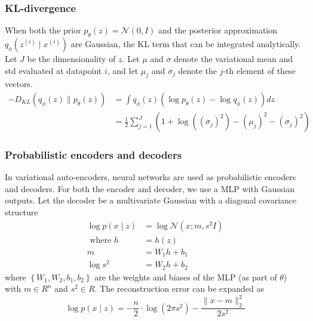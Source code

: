 \subsubsection*{KL-divergence}
When both the prior $p_{\theta}(z)=\mathcal{N} (0, I)$ and the posterior approximation $q_{\phi} \left(z^{(i)} \mid x^{(i)}\right)$ are Gaussian, the KL term that can be integrated analytically. Let $J$ be the dimensionality of $z$. Let $\mu$ and $\sigma$ denote the variational mean and std evaluated at datapoint $i$, and let $\mu_{j}$ and $\sigma_{j}$ denote the $j$-th element of these vectors.
\begin{equation*}
\begin{aligned}
-D_{KL}\left(q_{\phi}(z) \| p_{\theta}(z)\right)
&=\int q_{\phi}(z)\left(\log p_{\theta}(z)-\log q_{\phi}(z)\right) dz \\
&=\frac{1}{2} \sum_{j=1}^{J}\left(1+\log \left(\left(\sigma_{j}\right)^{2}\right)-\left(\mu_{j}\right)^{2}-\left(\sigma_{j}\right)^{2}\right)
\end{aligned}
\end{equation*}

\subsubsection*{Probabilistic encoders and decoders}
In variational auto-encoders, neural networks are used as probabilistic encoders and decoders. For both the encoder and decoder, we use a MLP with Gaussian outputs. Let the decoder be a multivariate Gaussian with a diagonal covariance structure
\begin{equation*}
\begin{aligned}
\log p\left(x \mid z\right) &=\log \mathcal{N}\left(x; m, {s^{2}}I\right) \\
\text{ where } h &= h \left(z\right) \\
m &=W_{1}h+b_{1} \\
\log {s^{2}} &=W_{2}h+b_{2}
\end{aligned}
\end{equation*}
where $\left\{W_{1}, W_{2}, b_{1}, b_{2} \right\}$ are the weights and biases of the MLP (as part of $\theta$) with $m \in R^{n}$ and $s^{2} \in R$. The reconstruction error can be expanded as
\begin{equation*}
\log p\left(x \mid z\right) = -\frac{n}{2} \cdot \log \left(2\pi{s^{2}}\right) - \frac{\lVert x -  m \rVert_{2}^{2}} {2{s^{2}}}
\end{equation*}
